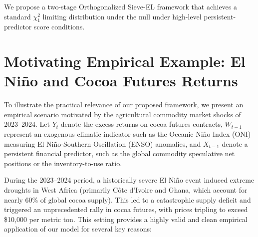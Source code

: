 \documentclass{article}
\begin{document}
We propose a two-stage Orthogonalized Sieve-EL framework that achieves a standard $\chi^2_1$ limiting distribution under the null under high-level persistent-predictor score conditions.

\section{Motivating Empirical Example: El Ni\~no and Cocoa Futures Returns}

To illustrate the practical relevance of our proposed framework, we present an empirical scenario motivated by the agricultural commodity market shocks of 2023--2024. Let $Y_t$ denote the excess returns on cocoa futures contracts, $W_{t-1}$ represent an exogenous climatic indicator such as the Oceanic Ni\~no Index (ONI) measuring El Ni\~no-Southern Oscillation (ENSO) anomalies, and $X_{t-1}$ denote a persistent financial predictor, such as the global commodity speculative net positions or the inventory-to-use ratio. 

During the 2023--2024 period, a historically severe El Ni\~no event induced extreme droughts in West Africa (primarily C\^ote d'Ivoire and Ghana, which account for nearly 60\% of global cocoa supply). This led to a catastrophic supply deficit and triggered an unprecedented rally in cocoa futures, with prices tripling to exceed \$10,000 per metric ton. This setting provides a highly valid and clean empirical application of our model for several key reasons:
\end{document}
